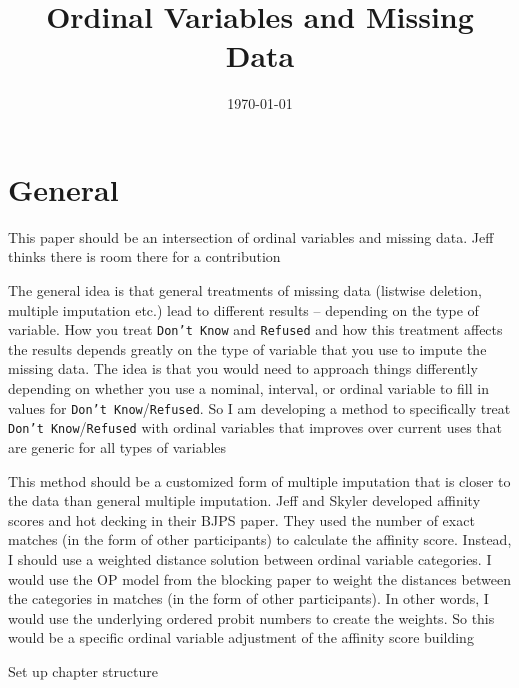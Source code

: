 

\title{Ordinal Variables and Missing Data}

\date{\today}



\maketitle

\section*{General}
	\begin{coi}
		\item This paper should be an intersection of ordinal variables and missing data. Jeff thinks there is room there for a contribution
		\item The general idea is that general treatments of missing data (listwise deletion, multiple imputation etc.) lead to different results -- depending on the type of variable. How you treat \texttt{Don't Know} and \texttt{Refused} and how this treatment affects the results depends greatly on the type of variable that you use to impute the missing data. The idea is that you would need to approach things differently depending on whether you use a nominal, interval, or ordinal variable to fill in values for \texttt{Don't Know}/\texttt{Refused}. So I am developing a method to specifically treat \texttt{Don't Know}/\texttt{Refused} with ordinal variables that improves over current uses that are generic for all types of variables
		\item This method should be a customized form of multiple imputation that is closer to the data than general multiple imputation. Jeff and Skyler developed affinity scores and hot decking in their BJPS paper. They used the number of exact matches (in the form of other participants) to calculate the affinity score. Instead, I should use a weighted distance solution between ordinal variable categories. I would use the OP model from the blocking paper to weight the distances between the categories in matches (in the form of other participants). In other words, I would use the underlying ordered probit numbers to create the weights. So this would be a specific ordinal variable adjustment of the affinity score building
		\item Set up chapter structure
	\end{coi}


